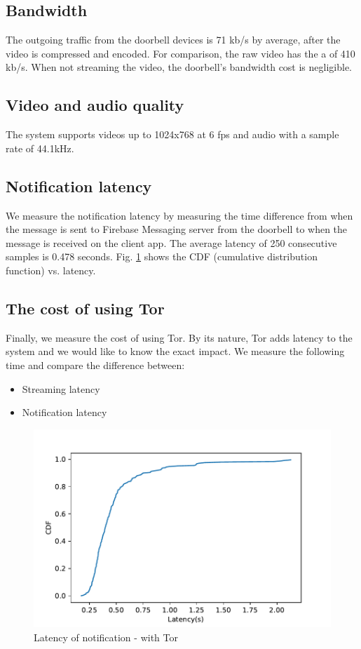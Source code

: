 \subsection{Bandwidth}
The outgoing traffic from the doorbell devices is 71 kb/s by average, after the video is compressed and encoded. For comparison, the raw video has the a of 410 kb/s. When not streaming the video, the doorbell's bandwidth cost is negligible.

\subsection{Video and audio quality}
The system supports videos up to 1024x768 at 6 fps and audio with a sample rate of 44.1kHz.

\subsection{Notification latency}
\label{subsec:notification_latency}
We measure the notification latency by measuring the time difference from when the message is sent to Firebase Messaging server from the doorbell to when the message is received on the client app. The average latency of 250 consecutive samples is 0.478 seconds. Fig. \ref{fig:notificationlatency_wTor} shows the CDF (cumulative distribution function) vs. latency.

\subsection{The cost of using Tor}
Finally, we measure the cost of using Tor. By its nature, Tor adds latency to the system and we would like to know the exact impact. We measure the following time and compare the difference between:

\begin{itemize}
	\item Streaming latency
	\item Notification latency
\end{itemize}

\begin{figure}
	\includegraphics[width=\linewidth]{notification_latency_withTor.pdf}
	\caption{Latency of notification - with Tor}
	\label{fig:notificationlatency_wTor}
\end{figure}

